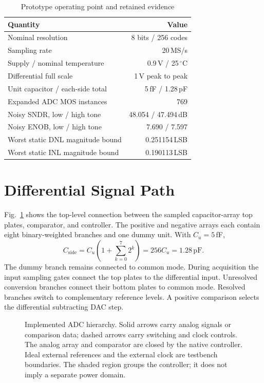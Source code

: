 \documentclass[10pt,conference,letterpaper]{IEEEtran}
\begin{document}
\begin{table}[!b]\centering
\caption{Prototype operating point and retained evidence}\label{tab:overview}
\begin{tabular}{lr}\toprule
Quantity & Value\\\midrule
Nominal resolution & 8 bits / 256 codes\\
Sampling rate & 20\,MS/s\\
Supply / nominal temperature & 0.9\,V / 25\,$^\circ$C\\
Differential full scale & 1\,V peak to peak\\
Unit capacitor / each-side total & 5\,fF / 1.28\,pF\\
Expanded ADC MOS instances & 769\\
Noisy SNDR, low / high tone & 48.054 / 47.494\,dB\\
Noisy ENOB, low / high tone & 7.690 / 7.597\\
Worst static DNL magnitude bound & 0.251154\,LSB\\
Worst static INL magnitude bound & 0.190113\,LSB\\\bottomrule
\end{tabular}
\end{table}

\section{Differential Signal Path}
Fig.~\ref{fig:system} shows the top-level connection between the sampled capacitor-array top plates, comparator, and controller. The positive and negative arrays each contain eight binary-weighted branches and one dummy unit. With $C_u=5$\,fF,
\begin{equation}
C_{\mathrm{side}}=C_u\left(1+\sum_{k=0}^{7}2^k\right)=256C_u=1.28\,\mathrm{pF}.
\end{equation}
The dummy branch remains connected to common mode. During acquisition the input sampling gates connect the top plates to the differential input. Unresolved conversion branches connect their bottom plates to common mode. Resolved branches switch to complementary reference levels. A positive comparison selects the differential subtracting DAC step.

\begin{figure}[!t]\centering
\resizebox{.96\textwidth}{!}{}
\caption{Implemented ADC hierarchy. Solid arrows carry analog signals or comparison data; dashed arrows carry switching and clock controls. The analog array and comparator are closed by the native controller. Ideal external references and the external clock are testbench boundaries. The shaded region groups the controller; it does not imply a separate power domain.}\label{fig:system}
\end{figure}
\end{document}
